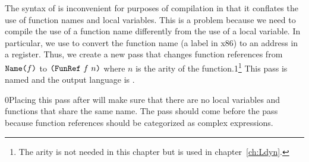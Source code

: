 \documentclass[7x10]{TimesAPriori_MIT}%
\newcommand{\gray}[1]{{\color{gray} #1}}
\def\racketEd{0}
\def\pythonEd{1}
\def\edition{1}
\newcommand{\racket}[1]{{\if\edition\racketEd{#1}\fi}}
\newcommand{\pythonColor}[0]{}
\newcommand{\python}[1]{{\if\edition\pythonEd\pythonColor #1\fi}}
\numberwithin{theorem}{chapter}
\numberwithin{definition}{chapter}
\numberwithin{equation}{chapter}
\begin{document}
The syntax of \LangFun{} is inconvenient for purposes of compilation
in that it conflates the use of function names and local
variables. This is a problem because we need to compile the use of a
function name differently from the use of a local variable.  In
particular, we use  to convert the function name (a label
in x86) to an address in a register.  Thus, we create a new pass that
changes function references from $\texttt{Name}\texttt{(} f\texttt{)}$ to $\texttt{(}\texttt{FunRef}~f~n\texttt{)}$ where
$n$ is the arity of the function.\python{\footnote{The arity is not
    needed in this chapter but is used in chapter~\ref{ch:Ldyn}.}}
This pass is named  and the output language
is \LangFunRef{}.




\racket{Placing this pass after  will make sure that
  there are no local variables and functions that share the same
  name.}
%
The  pass should come before the
 pass because function references
should be categorized as complex expressions.
\end{document}
